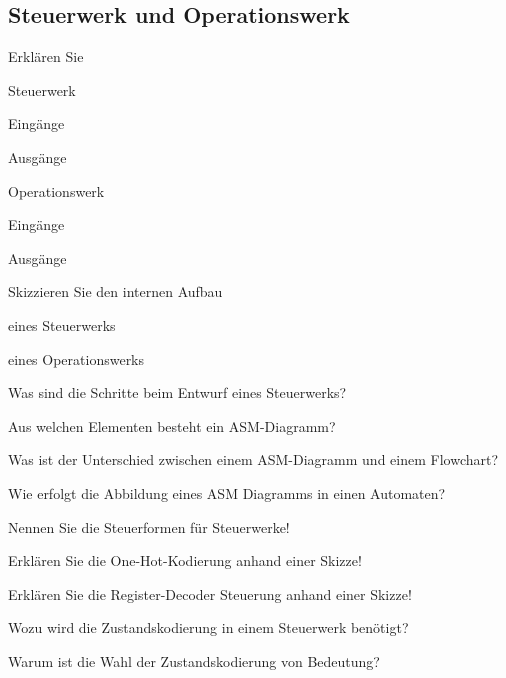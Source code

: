 \documentclass
[
  draft    = true,
  fontsize = 11pt,
  parskip  = half-,
  BCOR     = 0pt,
  DIV      = 11,
  ngerman,
  dvipsnames
]
{scrartcl}
\begin{document}
\subsection*{Steuerwerk und Operationswerk}
\begin{mytemize}
  \item Erklären Sie
        \begin{mytemize}
          \item Steuerwerk
                \begin{mytemize}
                  \item Eingänge
                  \item Ausgänge
                \end{mytemize}
          \item Operationswerk
                \begin{mytemize}
                  \item Eingänge
                  \item Ausgänge
                \end{mytemize}
        \end{mytemize}
  \item Skizzieren Sie den internen Aufbau
        \begin{mytemize}
          \item eines Steuerwerks
          \item eines Operationswerks
        \end{mytemize}
  \item Was sind die Schritte beim Entwurf eines Steuerwerks?
  \item Aus welchen Elementen besteht ein ASM-Diagramm?
  \item Was ist der Unterschied zwischen einem ASM-Diagramm und einem Flowchart?
  \item Wie erfolgt die Abbildung eines ASM Diagramms in einen Automaten?
  \item Nennen Sie die Steuerformen für Steuerwerke!
  \item Erklären Sie die One-Hot-Kodierung anhand einer Skizze!
  \item Erklären Sie die Register-Decoder Steuerung anhand einer Skizze!
  \item Wozu wird die Zustandskodierung in einem Steuerwerk benötigt?
        \begin{mytemize}
          \item Warum ist die Wahl der Zustandskodierung von Bedeutung?

\end{mytemize}
\end{mytemize}
\end{document}
